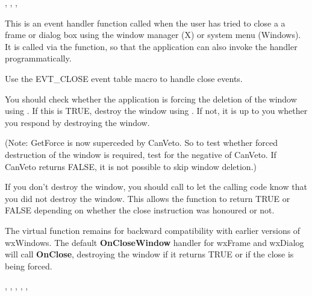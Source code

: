 
,\rtfsp
{},\rtfsp
{},\rtfsp
{}

\label{wxwindowonclosewindow}


This is an event handler function called when the user has tried to close a a frame
or dialog box using the window manager (X) or system menu (Windows). It is
called via the  function, so
that the application can also invoke the handler programmatically.

Use the EVT\_CLOSE event table macro to handle close events.

You should check whether the application is forcing the deletion of the window
using . If this is TRUE,
destroy the window using .
If not, it is up to you whether you respond by destroying the window.

(Note: GetForce is now superceded by CanVeto. So to test whether forced destruction of
the window is required, test for the negative of CanVeto. If CanVeto returns FALSE,
it is not possible to skip window deletion.)

If you don't destroy the window, you should call  to
let the calling code know that you did not destroy the window. This allows the  function
to return TRUE or FALSE depending on whether the close instruction was honoured or not.


The  virtual function remains
for backward compatibility with earlier versions of wxWindows. The
default {\bf OnCloseWindow} handler for wxFrame and wxDialog will call {\bf OnClose},
destroying the window if it returns TRUE or if the close is being forced.


,\rtfsp
{},\rtfsp
{},\rtfsp
{},\rtfsp
{},\rtfsp
{}

